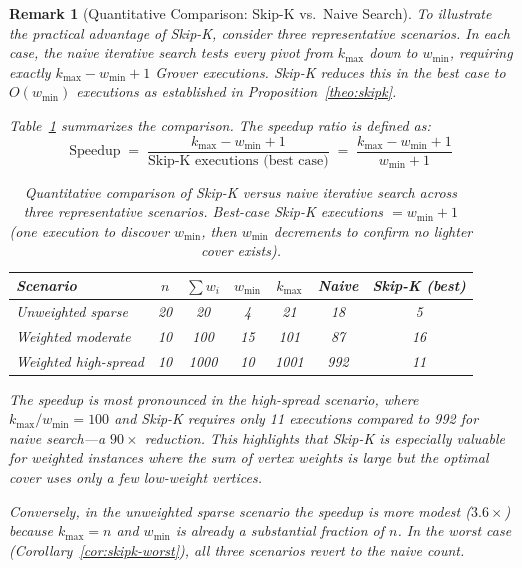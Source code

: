 \documentclass{ieeeaccess}
\newtheorem{rem}{Remark}
\begin{document}
\begin{rem}[Quantitative Comparison: Skip-K vs.\ Naive Search]
\label{rem:skipk-example}
To illustrate the practical advantage of Skip-K, consider
three representative scenarios. In each case, the naive
iterative search tests every pivot from $k_{\max}$ down to
$w_{\min}$, requiring exactly $k_{\max} - w_{\min} + 1$
Grover executions. Skip-K reduces this in the best case to
$O(w_{\min})$ executions as established in
Proposition~\ref{theo:skipk}.

Table~\ref{tab:skipk-comparison} summarizes the comparison.
The speedup ratio is defined as:
\begin{equation}
    \mathrm{Speedup}
    \;=\;
    \frac{k_{\max} - w_{\min} + 1}{\text{Skip-K executions
    (best case)}}
    \;=\;
    \frac{k_{\max} - w_{\min} + 1}{w_{\min} + 1}
    \label{eq:skipk-speedup}
\end{equation}

\begin{table}[htbp]
\centering
\caption{Quantitative comparison of Skip-K versus naive
iterative search across three representative scenarios.
Best-case Skip-K executions $= w_{\min} + 1$ (one
execution to discover $w_{\min}$, then $w_{\min}$
decrements to confirm no lighter cover exists).}
\label{tab:skipk-comparison}
\begin{tabular}{lcccccc}
\hline
\textbf{Scenario} &
$n$ & $\sum w_i$ & $w_{\min}$ & $k_{\max}$ &
\textbf{Naive} & \textbf{Skip-K (best)} \\
\hline
Unweighted sparse
  & 20 & 20  & 4  & 21  & 18  & 5   \\
Weighted moderate
  & 10 & 100 & 15 & 101 & 87  & 16  \\
Weighted high-spread
  & 10 & 1000 & 10 & 1001 & 992 & 11 \\
\hline
\end{tabular}
\end{table}

The speedup is most pronounced in the high-spread scenario,
where $k_{\max}/w_{\min} = 100$ and Skip-K requires only
11 executions compared to 992 for naive search---a
$90\times$ reduction. This highlights that Skip-K is
especially valuable for weighted instances where the sum
of vertex weights is large but the optimal cover uses only
a few low-weight vertices.

Conversely, in the unweighted sparse scenario the speedup
is more modest ($3.6\times$) because $k_{\max} = n$ and
$w_{\min}$ is already a substantial fraction of $n$. In the
worst case (Corollary~\ref{cor:skipk-worst}), all three
scenarios revert to the naive count.
\end{rem}
\end{document}
